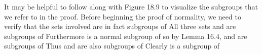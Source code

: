 \documentclass[11pt,oneside]{article}
\begin{document}
\begin{BookBody}
 It may be helpful to follow along with Figure 18.9 to visualize the subgroups that we refer to in the proof. Before beginning the proof of normality, we need to verify that the sets involved are in fact subgroups of  All three sets  and  are subgroups of  Furthermore is a normal subgroup of  so by Lemma 16.4,  and  are subgroups of  Thus  and  are also subgroups of  Clearly is a subgroup of 

\end{BookBody}

\BookNarrativetrue
\end{document}
